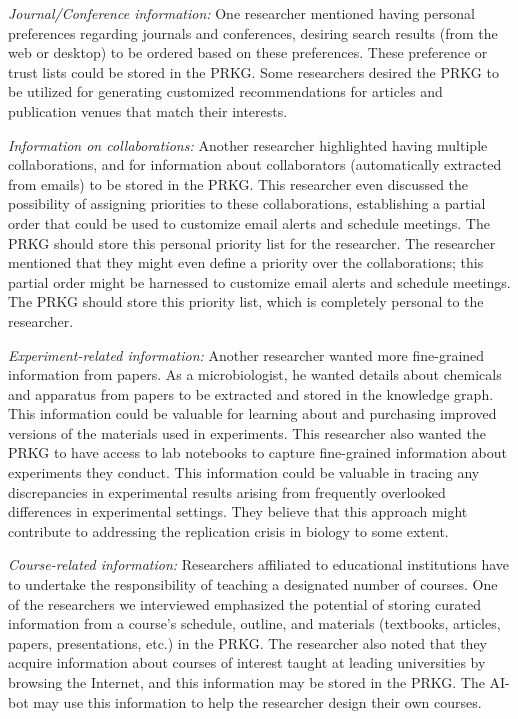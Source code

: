 \documentclass[11pt,pdftex]{article}
\begin{document}
\textit{Journal/Conference information: }One researcher mentioned having personal preferences regarding journals and conferences, desiring search results (from the web or desktop) to be ordered based on these preferences. These preference or trust lists could be stored in the PRKG. Some researchers desired the PRKG to be utilized for generating customized recommendations for articles and publication venues that match their interests. 

\textit{Information on collaborations: }Another researcher highlighted having multiple collaborations, and for information about collaborators (automatically extracted from emails) to be stored in the PRKG. This researcher even discussed the possibility of assigning priorities to these collaborations, establishing a partial order that could be used to customize email alerts and schedule meetings. The PRKG should store this personal priority list for the researcher. The researcher mentioned that they might even define a priority over the collaborations; this partial order might be harnessed to customize email alerts and schedule meetings. The PRKG should store this priority list, which is completely personal to the researcher.

\textit{Experiment-related information: }Another researcher wanted more fine-grained information from papers. As a microbiologist, he wanted details about chemicals and apparatus from papers to be extracted and stored in the knowledge graph. This information could be valuable for learning about and purchasing improved versions of the materials used in experiments. This researcher also wanted the PRKG to have access to lab notebooks to capture fine-grained information about experiments they conduct. This information could be valuable in tracing any discrepancies in experimental results arising from frequently overlooked differences in experimental settings. They believe that this approach might contribute to addressing the replication crisis in biology to some extent. 

\textit{Course-related information: }Researchers affiliated to educational institutions have to undertake the responsibility of teaching a designated number of courses. One of the researchers we interviewed emphasized the potential of storing curated information from a course's schedule, outline, and materials (textbooks, articles, papers, presentations, etc.) in the PRKG. The researcher also noted that they acquire information about courses of interest taught at leading universities by browsing the Internet, and this information may be stored in the PRKG. The AI-bot may use this information to help the researcher design their own courses.
\end{document}
